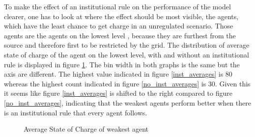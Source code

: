 \documentclass[a4paper]{article}
\begin{document}
To make the effect of an institutional rule on the performance of the model clearer, one has to look at where the effect should be most visible, 
the agents, which have the least chance to get charge in an unregulated scenario. Those agents are the agents on the lowest level ,
because they are furthest from the source and therefore first to be restricted by the grid.
The distribution of average state of charge of the agent on the lowest level, with and without an institutional
rule is displayed in figure \ref{inst_averages_second}. The bin width in both graphs is the same but the axis are different. 
The highest value indicated in figure \ref{inst_averages} is 80  whereas the highest count indicated in figure \ref{no_inst_averages}
is 30. Given this it seems like figure \ref{inst_averages} is shifted to the right compared to figure \ref{no_inst_averages},
indicating that the weakest agents perform better when there is an institutional rule that every agent follows. \\
\begin{figure}[!ht]
\caption{Average State of Charge of weakest agent}
\label{inst_averages_second}
\end{figure}
\end{document}
